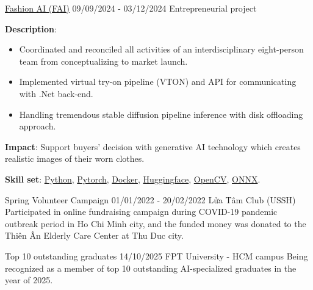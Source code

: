 \documentclass{src/preamble/doc_class}
\begin{document}
	\begin{SecondaryMainBar}{\ColorBackground}{\ColorTextSide}
	\end{SecondaryMainBar}

	\begin{SecondaryMainPart}
		\Experience
		{\ColorHighlight}
		{\href{https://fashion-ai-innovation.vercel.app/}{Fashion AI (FAI)}}
		{09/09/2024 - 03/12/2024}
		{Entrepreneurial project}
		{
			\textbf{Description}:
			\begin{itemize}[label=$\bullet$,topsep=-.5ex,itemsep=-0.5ex]
				\item Coordinated and reconciled all activities of an interdisciplinary eight-person team from conceptualizing to market launch.

				\item Implemented virtual try-on pipeline (VTON) and API for communicating with .Net back-end.

				\item Handling tremendous stable diffusion pipeline inference with disk offloading approach.
			\end{itemize}
			\vspace{0.15cm}

			\textbf{Impact}: Support buyers' decision with generative AI technology which creates realistic images of their worn clothes.
			\vspace{.15cm}

			\textbf{Skill set}: \href{https://www.python.org/}{Python}, \href{https://pytorch.org/}{Pytorch}, \href{https://www.docker.com/}{Docker}, \href{https://huggingface.co/}{Huggingface}, \href{https://opencv.org/}{OpenCV}, \href{https://onnx.ai/}{ONNX}.
		}
				\vspace{.35cm}

		\Experience
		{\ColorHighlight}
		{Spring Volunteer Campaign}
		{01/01/2022 - 20/02/2022}
		{Lửa Tâm Club (USSH)}
		{
			Participated in online fundraising campaign during COVID-19 pandemic outbreak period in Ho Chi Minh city, and the funded money was donated to the Thiên Ân Elderly Care Center at Thu Duc city.
		}

		\Experience
		{\ColorHighlight}
		{Top 10 outstanding graduates}
		{14/10/2025}
		{FPT University - HCM campus}
		{
			Being recognized as a member of top 10 outstanding AI-specialized graduates in the year of 2025.
		}
	\end{SecondaryMainPart}
\end{document}
